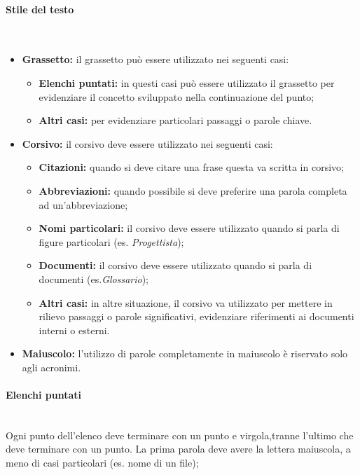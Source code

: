 		\paragraph{Stile del testo} \mbox{} \\
		\begin{itemize}
		\item \textbf{Grassetto:} il grassetto può essere utilizzato nei seguenti casi:
			\begin{itemize}
			\item \textbf{Elenchi puntati:} in questi casi può essere utilizzato il grassetto per evidenziare il concetto sviluppato nella continuazione del punto;
			\item \textbf{Altri casi:} per evidenziare particolari passaggi o parole chiave.
			\end{itemize}
		
		\item \textbf{Corsivo:} il corsivo deve essere utilizzato nei seguenti casi:
			\begin{itemize}
				\item \textbf{Citazioni:} quando si deve citare una frase questa va scritta in corsivo;
				\item \textbf{Abbreviazioni:} quando possibile si deve preferire una parola completa ad un’abbreviazione;
				\item \textbf{Nomi particolari:} il corsivo deve essere utilizzato quando si parla di figure particolari (es. \textit{Progettista});
				\item \textbf{Documenti:} il corsivo deve essere utilizzato quando si parla di documenti (es.\textit{Glossario});
				\item \textbf{Altri casi:} in altre situazione, il corsivo va utilizzato per mettere in rilievo passaggi o parole significativi, evidenziare riferimenti ai documenti interni o esterni.
			\end{itemize}
		
		\item \textbf{Maiuscolo:} l’utilizzo di parole completamente in maiuscolo è riservato solo agli acronimi.
		
		\end{itemize}
		
		\paragraph{Elenchi puntati} \mbox{} \\
		Ogni punto dell’elenco deve terminare con un punto e virgola,tranne l’ultimo che deve terminare con un punto. La prima parola deve avere la lettera maiuscola, a meno di casi particolari (es. nome di un file);
		
